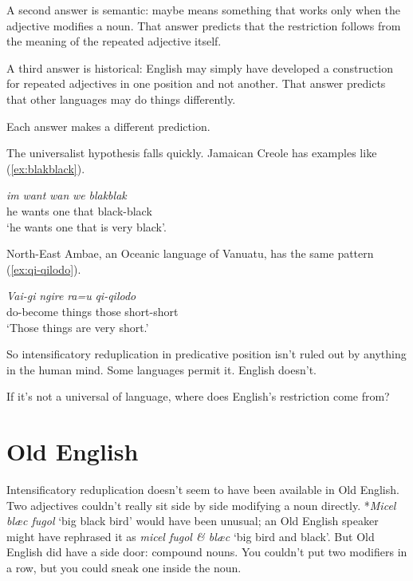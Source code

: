A second answer is semantic: maybe  means something that works only when the adjective modifies a noun. That answer predicts that the restriction follows from the meaning of the repeated adjective itself.

A third answer is historical: English may simply have developed a construction for repeated adjectives in one position and not another. That answer predicts that other languages may do things differently.

Each answer makes a different prediction.

\bigskip

The universalist hypothesis falls quickly. Jamaican Creole has examples like (\ref{ex:blakblack}).

\ea \label{ex:blakblack}
    \gll\textit{im} \textit{want} \textit{wan} \textit{we} \textit{blakblak}\\
    he wants one that black-black\\
    \glt `he wants one that is very black'\hfill\citep[129]{Gooden2003}.
\z

North-East Ambae, an Oceanic language of Vanuatu, has the same pattern (\ref{ex:qi-qilodo}).

\ea \label{ex:qi-qilodo}
    \gll \textit{Vai-gi} \textit{ngire} \textit{ra=u} \textit{qi-qilodo}\\
        do-become things those short-short \\
    \glt `Those things are very short.'\hfill\citep[278]{Hyslop2004}
\z

\noindent So intensificatory reduplication in predicative position isn't ruled out by anything in the human mind. Some languages permit it. English doesn't.

If it's not a universal of language, where does English's restriction come from?

\section{Old English}

Intensificatory reduplication doesn't seem to have been available in Old English. Two adjectives couldn't really sit side by side modifying a noun directly. *\textit{Micel blæc fugol} `big black bird' would have been unusual; an Old English speaker might have rephrased it as \textit{micel fugol \& blæc} `big bird and black'. But Old English did have a side door: compound nouns. You couldn't put two modifiers in a row, but you could sneak one inside the noun.

